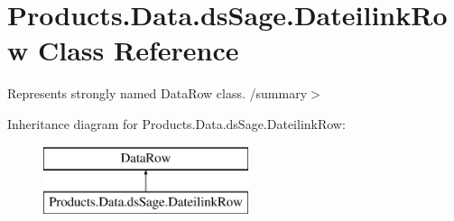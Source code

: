 \hypertarget{class_products_1_1_data_1_1ds_sage_1_1_dateilink_row}{}\section{Products.\+Data.\+ds\+Sage.\+Dateilink\+Row Class Reference}
\label{class_products_1_1_data_1_1ds_sage_1_1_dateilink_row}


Represents strongly named Data\+Row class. /summary$>$  


Inheritance diagram for Products.\+Data.\+ds\+Sage.\+Dateilink\+Row\+:\begin{figure}[H]
\begin{center}
\leavevmode
\includegraphics[height=2.000000cm]{class_products_1_1_data_1_1ds_sage_1_1_dateilink_row}
\end{center}
\end{figure}
